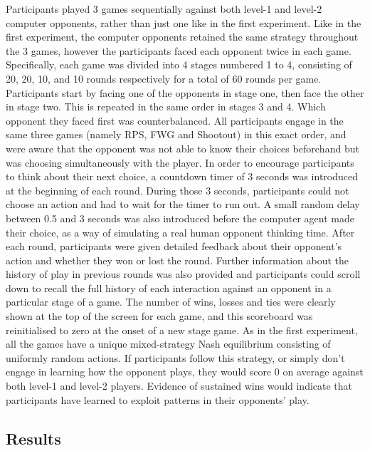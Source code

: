 \documentclass[
  english,
  man,floatsintext]{apa6}
\begin{document}
Participants played 3 games sequentially against both level-1 and level-2 computer opponents, rather than just one like in the first experiment. Like in the first experiment, the computer opponents retained the same strategy throughout the 3 games, however the participants faced each opponent twice in each game. Specifically, each game was divided into 4 stages numbered 1 to 4, consisting of 20, 20, 10, and 10 rounds respectively for a total of 60 rounds per game. Participants start by facing one of the opponents in stage one, then face the other in stage two. This is repeated in the same order in stages 3 and 4. Which opponent they faced first was counterbalanced. All participants engage in the same three games (namely RPS, FWG and Shootout) in this exact order, and were aware that the opponent was not able to know their choices beforehand but was choosing simultaneously with the player.
In order to encourage participants to think about their next choice, a countdown timer of 3 seconds was introduced at the beginning of each round. During those 3 seconds, participants could not choose an action and had to wait for the timer to run out. A small random delay between 0.5 and 3 seconds was also introduced before the computer agent made their choice, as a way of simulating a real human opponent thinking time. After each round, participants were given detailed feedback about their opponent's action and whether they won or lost the round. Further information about the history of play in previous rounds was also provided and participants could scroll down to recall the full history of each interaction against an opponent in a particular stage of a game. The number of wins, losses and ties were clearly shown at the top of the screen for each game, and this scoreboard was reinitialised to zero at the onset of a new stage game.
As in the first experiment, all the games have a unique mixed-strategy Nash equilibrium consisting of uniformly random actions. If participants follow this strategy, or simply don't engage in learning how the opponent plays, they would score 0 on average against both level-1 and level-2 players. Evidence of sustained wins would indicate that participants have learned to exploit patterns in their opponents' play.

\hypertarget{results-1}{%
\subsection{Results}\label{results-1}}
\end{document}

